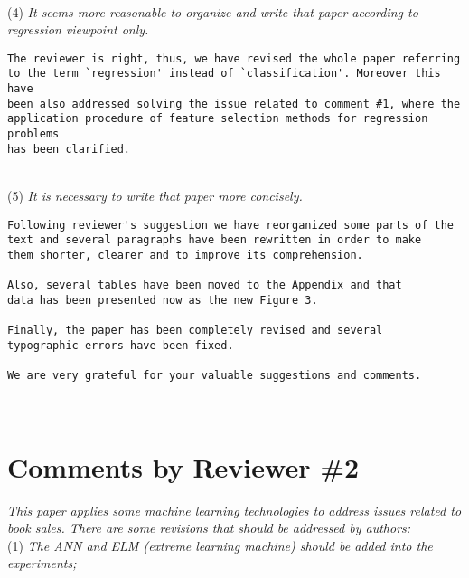 \documentclass[preprint]{elsarticle}
\begin{document}
~\\
\noindent (4) \emph{It seems more reasonable to organize and write that paper according to regression viewpoint only. } 

\begin{verbatim}
The reviewer is right, thus, we have revised the whole paper referring 
to the term `regression' instead of `classification'. Moreover this have 
been also addressed solving the issue related to comment #1, where the
application procedure of feature selection methods for regression problems 
has been clarified. 
\end{verbatim}

~\\
\noindent (5) \emph{It is necessary to write that paper more concisely. } 

\begin{verbatim}
Following reviewer's suggestion we have reorganized some parts of the 
text and several paragraphs have been rewritten in order to make 
them shorter, clearer and to improve its comprehension. 

Also, several tables have been moved to the Appendix and that
data has been presented now as the new Figure 3.

Finally, the paper has been completely revised and several 
typographic errors have been fixed. 

We are very grateful for your valuable suggestions and comments. 
\end{verbatim}


~\\

\section{Comments by Reviewer \#2}

\noindent \emph{This paper applies some machine learning technologies to address issues related to book sales. There are some revisions that should be addressed by authors: } \\


\noindent (1) \emph{The ANN and ELM (extreme learning machine) should be added into the experiments; } 
\end{document}
